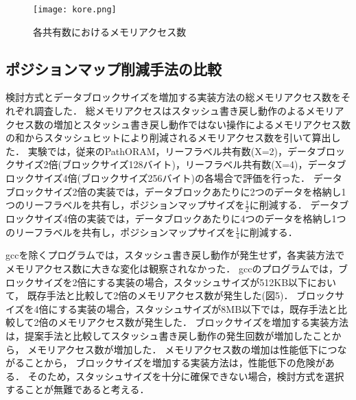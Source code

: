 \documentclass{jarticle}
\begin{document}

\begin{figure}[t]
  \begin{center}
  \texttt{[image: kore.png]}
  \caption{各共有数におけるメモリアクセス数}
  \label{tredss}
  \end{center}
\end{figure}

\subsection{ポジションマップ削減手法の比較}
検討方式とデータブロックサイズを増加する実装方法の総メモリアクセス数をそれぞれ調査した．
総メモリアクセスはスタッシュ書き戻し動作のよるメモリアクセス数の増加とスタッシュ書き戻し動作ではない操作によるメモリアクセス数
の和からスタッシュヒットにより削減されるメモリアクセス数を引いて算出した．
実験では，従来のPathORAM，リーフラベル共有数(X=2)，データブロックサイズ2倍(ブロックサイズ128バイト)，リーフラベル共有数(X=4)，データブロックサイズ4倍(ブロックサイズ256バイト)の各場合で評価を行った．
データブロックサイズ2倍の実装では，データブロックあたりに2つのデータを格納し1つのリーフラベルを共有し，ポジションマップサイズを$\frac{1}{2}$に削減する．
データブロックサイズ4倍の実装では，データブロックあたりに4つのデータを格納し1つのリーフラベルを共有し，ポジションマップサイズを$\frac{1}{4}$に削減する．


gccを除くプログラムでは，スタッシュ書き戻し動作が発生せず，各実装方法でメモリアクセス数に大きな変化は観察されなかった．
gccのプログラムでは，ブロックサイズを2倍にする実装の場合，スタッシュサイズが512KB以下において，
既存手法と比較して2倍のメモリアクセス数が発生した(図5)．
ブロックサイズを4倍にする実装の場合，スタッシュサイズが8MB以下では，既存手法と比較して2倍のメモリアクセス数が発生した．
ブロックサイズを増加する実装方法は，提案手法と比較してスタッシュ書き戻し動作の発生回数が増加したことから，
メモリアクセス数が増加した．
メモリアクセス数の増加は性能低下につながることから，
ブロックサイズを増加する実装方法は，性能低下の危険がある．
そのため，スタッシュサイズを十分に確保できない場合，検討方式を選択することが無難であると考える．
\end{document}
